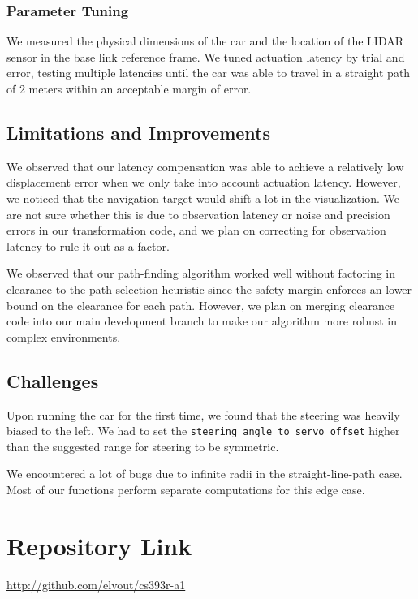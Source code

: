 \documentclass[11pt]{article}
\begin{document}
\subsubsection{Parameter Tuning}

We measured the physical dimensions of the car and the location of the LIDAR
sensor in the base link reference frame. We tuned actuation latency by trial and
error, testing multiple latencies until the car was able to travel in a straight
path of 2 meters within an acceptable margin of error.

\subsection{Limitations and Improvements}

We observed that our latency compensation was able to achieve a relatively low
displacement error when we only take into account actuation latency. However, we
noticed that the navigation target would shift a lot in the visualization. We
are not sure whether this is due to observation latency or noise and precision
errors in our transformation code, and we plan on correcting for observation
latency to rule it out as a factor.

\bigskip
\noindent
We observed that our path-finding algorithm worked well without factoring in
clearance to the path-selection heuristic since the safety margin enforces an
lower bound on the clearance for each path. However, we plan on merging
clearance code into our main development branch to make our algorithm more
robust in complex environments.


\subsection{Challenges}

Upon running the car for the first time, we found that the steering was heavily
biased to the left. We had to set the
\texttt{steering\_angle\_to\_servo\_offset} higher than the suggested range for
steering to be symmetric.

We encountered a lot of bugs due to infinite radii in the straight-line-path
case. Most of our functions perform separate computations for this edge case.

\section{Repository Link}
\href{http://github.com/elvout/cs393r-a1}{http://github.com/elvout/cs393r-a1}
\end{document}
